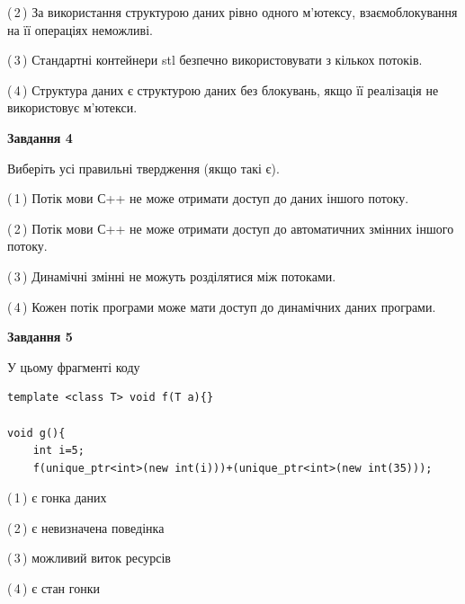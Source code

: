 \documentclass[12pt, ukrainian]{article}
\begin{document}
\begin {large}
{(\,2\,) За використання структурою даних рівно одного м’ютексу, взаємоблокування на її операціях неможливі.%

(\,3\,) Стандартні контейнери stl безпечно використовувати з кількох потоків.%

(\,4\,) Структура даних є структурою даних без блокувань, якщо її реалізація не використовує м’ютекси.%



\begin{center}
\textbf{Завдання 4}
\end{center}
Виберіть усі правильні твердження (якщо такі є).\par
\vspace{2mm}

(\,1\,) Потік мови С++ не може отримати доступ до даних іншого потоку.%

(\,2\,) Потік мови С++ не може отримати доступ до автоматичних змінних іншого потоку.%

(\,3\,) Динамічні змінні не можуть розділятися між потоками.%

(\,4\,) Кожен потік програми може мати доступ до динамічних даних програми.%



\begin{center}
\textbf{Завдання 5}
\end{center}
У цьому фрагменті коду
\begin{verbatim}
template <class T> void f(T a){}

void g(){
    int i=5;
    f(unique_ptr<int>(new int(i)))+(unique_ptr<int>(new int(35)));
\end{verbatim}
(\,1\,) є гонка даних%

(\,2\,) є невизначена поведінка%

(\,3\,) можливий виток ресурсів%

(\,4\,) є стан гонки%


}
\end {large}
\end{document}
